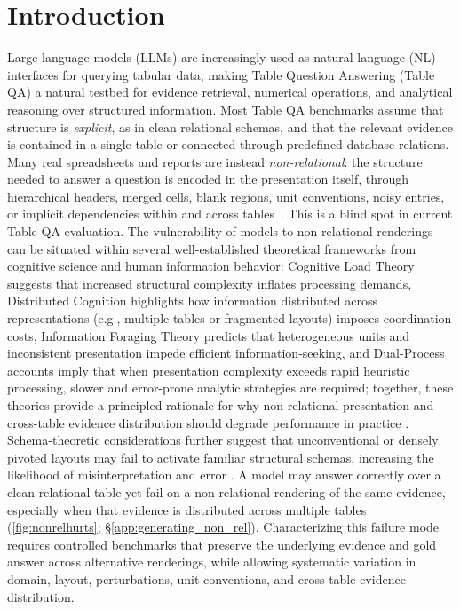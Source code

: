 \section{Introduction} 
\label{sec:intro}
Large language models (LLMs) are increasingly used as natural-language (NL) interfaces for querying tabular data, making Table Question Answering (Table QA) a natural testbed for evidence retrieval, numerical operations, and analytical reasoning over structured information. Most Table QA benchmarks assume that structure is \emph{explicit}, as in clean relational schemas, and that the relevant evidence is contained in a single table or connected through predefined database relations. Many real spreadsheets and reports are instead \emph{non-relational}: the structure needed to answer a question is encoded in the presentation itself, through hierarchical headers, merged cells, blank regions, unit conventions, noisy entries, or implicit dependencies within and across tables~\cite{1.10}.
This is a blind spot in current Table QA evaluation. The vulnerability of models to non-relational renderings can be situated within several well-established theoretical frameworks from cognitive science and human information behavior: Cognitive Load Theory suggests that increased structural complexity inflates processing demands, Distributed Cognition highlights how information distributed across representations (e.g., multiple tables or fragmented layouts) imposes coordination costs, Information Foraging Theory predicts that heterogeneous units and inconsistent presentation impede efficient information-seeking, and Dual-Process accounts imply that when presentation complexity exceeds rapid heuristic processing, slower and error-prone analytic strategies are required; together, these theories provide a principled rationale for why non-relational presentation and cross-table evidence distribution should degrade performance in practice \cite{sweller1988,hutchins1995,pirolli1999,kahneman2011}. Schema-theoretic considerations further suggest that unconventional or densely pivoted layouts may fail to activate familiar structural schemas, increasing the likelihood of misinterpretation and error \cite{bartlett1932}.
A model may answer correctly over a clean relational table yet fail on a non-relational rendering of the same evidence, especially when that evidence is distributed across multiple tables (\autoref{fig:nonrelhurts}; \S\ref{app:generating_non_rel}). Characterizing this failure mode requires controlled benchmarks that preserve the underlying evidence and gold answer across alternative renderings, while allowing systematic variation in domain, layout, perturbations, unit conventions, and cross-table evidence distribution.
